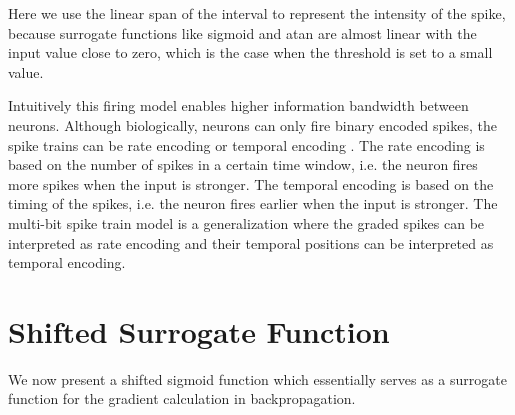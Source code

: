     Here we use the linear span of the interval to represent the intensity of the spike, because surrogate functions like sigmoid and atan are almost linear with the input value close to zero, which is the case when the threshold is set to a small value. 

    Intuitively this firing model enables higher information bandwidth between neurons. Although biologically, neurons can only fire binary encoded spikes, the spike trains can be rate encoding \cite{jphysiol.1962.sp006837} or temporal encoding \cite{doi:10.1073/pnas.0610368104}. The rate encoding is based on the number of spikes in a certain time window, i.e. the neuron fires more spikes when the input is stronger. The temporal encoding is based on the timing of the spikes, i.e. the neuron fires earlier when the input is stronger.
    The multi-bit spike train model is a generalization where the graded spikes can be interpreted as rate encoding and their temporal positions can be interpreted as temporal encoding. 

\section{Shifted Surrogate Function}
\label{sec:shifted-surrogate-function}
    We now present a shifted sigmoid function which essentially serves as a surrogate function for the gradient calculation in backpropagation. 

